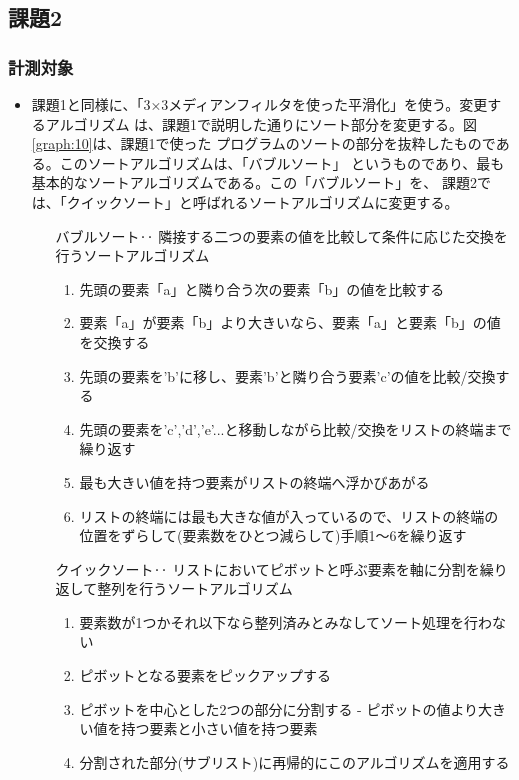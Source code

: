 \subsection{課題2}
\subsubsection{計測対象}
\begin{itemize}
  \item 課題1と同様に、「3×3メディアンフィルタを使った平滑化」を使う。変更するアルゴリズム
  は、課題1で説明した通りにソート部分を変更する。図\ref{graph:10}は、課題1で使った
  プログラムのソートの部分を抜粋したものである。このソートアルゴリズムは、「バブルソート」
  というものであり、最も基本的なソートアルゴリズムである。この「バブルソート」を、
  課題2では、「クイックソート」と呼ばれるソートアルゴリズムに変更する。
  \begin{itemize}
    \setlength{\leftskip}{2cm}
    \item[バブルソート‥]隣接する二つの要素の値を比較して条件に応じた交換を行うソートアルゴリズム\cite{url1}
    \begin{enumerate}
      \item 先頭の要素「a」と隣り合う次の要素「b」の値を比較する
      \item 要素「a」が要素「b」より大きいなら、要素「a」と要素「b」の値を交換する
      \item 先頭の要素を'b'に移し、要素'b'と隣り合う要素'c'の値を比較/交換する
      \item 先頭の要素を'c','d','e'...と移動しながら比較/交換をリストの終端まで繰り返す
      \item 最も大きい値を持つ要素がリストの終端へ浮かびあがる
      \item リストの終端には最も大きな値が入っているので、リストの終端の位置をずらして(要素数をひとつ減らして)手順1〜6を繰り返す
    \end{enumerate}

    \item[クイックソート‥] リストにおいてピボットと呼ぶ要素を軸に分割を繰り返して整列を行うソートアルゴリズム\cite{url1}
    \begin{enumerate}
      \item 要素数が1つかそれ以下なら整列済みとみなしてソート処理を行わない
      \item ピボットとなる要素をピックアップする
      \item ピボットを中心とした2つの部分に分割する - ピボットの値より大きい値を持つ要素と小さい値を持つ要素
      \item 分割された部分(サブリスト)に再帰的にこのアルゴリズムを適用する
    \end{enumerate}


\end{itemize}
\end{itemize}
